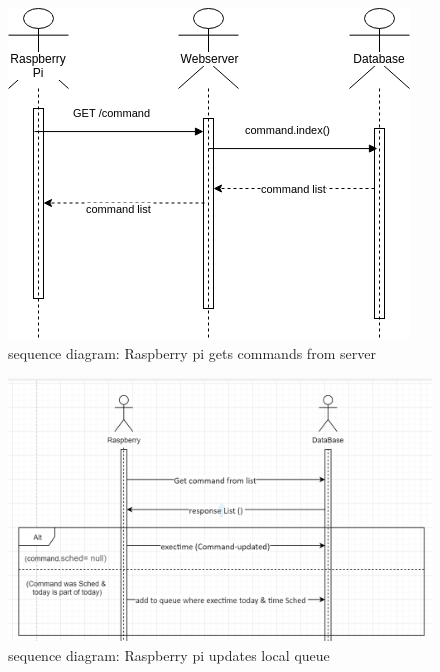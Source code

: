 \documentclass[12pt, oneside, a4paper]{book}
\begin{document}
				\begin{figure}[H]
					\caption{sequence diagram: Raspberry pi gets commands from server}					
					\label{rp_command_list}
					\includegraphics[width=\linewidth]{img/sequece_rp_command.png}
				\end{figure}
				\begin{figure}[H]
					\caption{sequence diagram: Raspberry pi updates local queue}					\label{rp_queue}
					\includegraphics[width=\linewidth]{img/sequence_queue.png}
				\end{figure}
\end{document}
